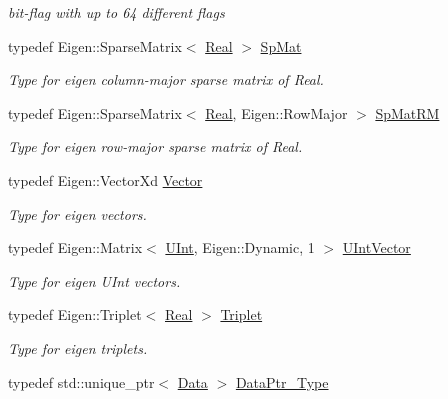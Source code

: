 \begin{DoxyCompactItemize}
\begin{DoxyCompactList}\small\item\em bit-\/flag with up to 64 different flags \end{DoxyCompactList}\item 
typedef Eigen\+::\+Sparse\+Matrix$<$ \hyperlink{namespaceFVCode3D_a40c1f5588a248569d80aa5f867080e83}{Real} $>$ \hyperlink{namespaceFVCode3D_ac1032289d96638cf0ad6c52ef639095f}{Sp\+Mat}
\begin{DoxyCompactList}\small\item\em Type for eigen column-\/major sparse matrix of Real. \end{DoxyCompactList}\item 
typedef Eigen\+::\+Sparse\+Matrix$<$ \hyperlink{namespaceFVCode3D_a40c1f5588a248569d80aa5f867080e83}{Real}, Eigen\+::\+Row\+Major $>$ \hyperlink{namespaceFVCode3D_a43d700a82a0a7ea1a4ad9768c59dc536}{Sp\+Mat\+RM}
\begin{DoxyCompactList}\small\item\em Type for eigen row-\/major sparse matrix of Real. \end{DoxyCompactList}\item 
typedef Eigen\+::\+Vector\+Xd \hyperlink{namespaceFVCode3D_a16ccf345652402bccd1a5d2e6782526c}{Vector}
\begin{DoxyCompactList}\small\item\em Type for eigen vectors. \end{DoxyCompactList}\item 
typedef Eigen\+::\+Matrix$<$ \hyperlink{namespaceFVCode3D_a4bf7e328c75d0fd504050d040ebe9eda}{U\+Int}, Eigen\+::\+Dynamic, 1 $>$ \hyperlink{namespaceFVCode3D_a9c3dcef0872c1dbd4aaf770d08421fd7}{U\+Int\+Vector}
\begin{DoxyCompactList}\small\item\em Type for eigen U\+Int vectors. \end{DoxyCompactList}\item 
typedef Eigen\+::\+Triplet$<$ \hyperlink{namespaceFVCode3D_a40c1f5588a248569d80aa5f867080e83}{Real} $>$ \hyperlink{namespaceFVCode3D_a1d6853f6847ee83d6e823a500a8232fd}{Triplet}
\begin{DoxyCompactList}\small\item\em Type for eigen triplets. \end{DoxyCompactList}\item 
typedef std\+::unique\+\_\+ptr$<$ \hyperlink{classFVCode3D_1_1Data}{Data} $>$ \hyperlink{namespaceFVCode3D_a3d19a370a98afe491a9e17a646a9c56f}{Data\+Ptr\+\_\+\+Type}

\end{DoxyCompactItemize}
